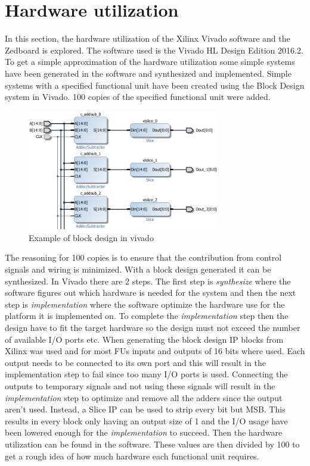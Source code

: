 \section{Hardware utilization}
In this section, the hardware utilization of the Xilinx Vivado software and the Zedboard is explored. The software used is the Vivado HL Design Edition 2016.2. To get a simple approximation of the hardware utilization some simple systems have been generated in the software and synthesized and implemented. Simple systems with a specified functional unit have been created using the Block Design system in Vivado. 100 copies of the specified functional unit were added. 
\begin{figure}[ht!]
  \centering
  \includegraphics[width=0.75\textwidth]{figures/Blockdesignexample.png}
  \caption{Example of block design in vivado}
  \label{fig:blodesexa}
\end{figure}
The reasoning for 100 copies is to ensure that the contribution from control signals and wiring is minimized. With a block design generated it can be synthesized. In Vivado there are 2 steps. The first step is \textit{synthesize} where the software figures out which hardware is needed for the system and then the next step is \textit{implementation} where the software optimize the hardware use for the platform it is implemented on. To complete the \textit{implementation} step then the design have to fit the target hardware so the design must not exceed the number of available I/O ports etc. When generating the block design IP blocks from Xilinx was used and for most FUs inputs and outputs of 16 bits where used. Each output needs to be connected to its own port and this will result in the implementation step to fail since too many I/O ports is used. Connecting the outputs to temporary signals and not using these signals will result in the \textit{implementation} step to optimize and remove all the adders since the output aren't used. Instead,  a Slice IP can be used to strip every bit but MSB. This results in every block only having an output size of \SI{1}{\bit} and the I/O usage have been lowered enough for the \textit{implementation} to succeed. Then the hardware utilization can be found in the software. These values are then divided by 100 to get a rough idea of how much hardware each functional unit requires.\\
